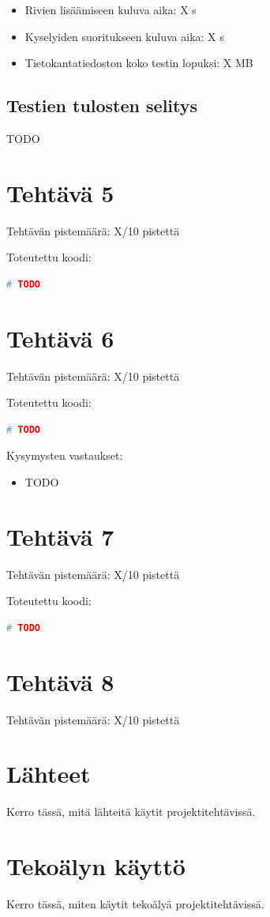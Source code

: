 \documentclass[a4paper,11pt]{article}
\begin{document}
\begin{itemize}
\item Rivien lisäämiseen kuluva aika: X s
\item Kyselyiden suoritukseen kuluva aika: X s
\item Tietokantatiedoston koko testin lopuksi: X MB
\end{itemize}

\subsection*{Testien tulosten selitys}

TODO

\section*{Tehtävä 5}

Tehtävän pistemäärä: X/10 pistettä

Toteutettu koodi:

\begin{lstlisting}[language=Python]
# TODO
\end{lstlisting}

\section*{Tehtävä 6}

Tehtävän pistemäärä: X/10 pistettä

Toteutettu koodi:

\begin{lstlisting}[language=Python]
# TODO
\end{lstlisting}

Kysymysten vastaukset:

\begin{itemize}
\item TODO
\end{itemize}

\section*{Tehtävä 7}

Tehtävän pistemäärä: X/10 pistettä

Toteutettu koodi:

\begin{lstlisting}[language=Python]
# TODO
\end{lstlisting}

\section*{Tehtävä 8}

Tehtävän pistemäärä: X/10 pistettä

\section*{Lähteet}

Kerro tässä, mitä lähteitä käytit projektitehtävissä.

\section*{Tekoälyn käyttö}

Kerro tässä, miten käytit tekoälyä projektitehtävissä.
\end{document}
